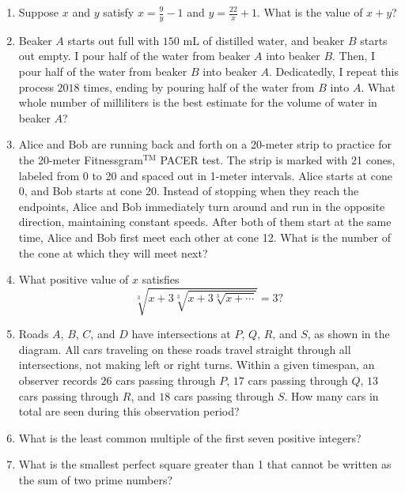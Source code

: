 \documentclass[11pt]{article}
\begin{document}
\begin{enumerate}[1.]
			\item Suppose $x$ and $y$ satisfy $x = \frac{9}{y} - 1$ and $y = \frac{22}{x} + 1$. What is the value of $x + y$?
			
			\item Beaker $A$ starts out full with $150$ mL of distilled water, and beaker $B$ starts out empty. I pour half of the water from beaker $A$ into beaker $B$. Then, I pour half of the water from beaker $B$ into beaker $A$. Dedicatedly, I repeat this process $2018$ times, ending by pouring half of the water from $B$ into $A$. What whole number of milliliters is the best estimate for the volume of water in beaker $A$?
			
			\item Alice and Bob are running back and forth on a 20-meter strip to practice for the 20-meter Fitnessgram$^\text{TM}$ PACER test. The strip is marked with 21 cones, labeled from 0 to 20 and spaced out in 1-meter intervals. Alice starts at cone 0, and Bob starts at cone 20. Instead of stopping when they reach the endpoints, Alice and Bob immediately turn around and run in the opposite direction, maintaining constant speeds. After both of them start at the same time, Alice and Bob first meet each other at cone 12. What is the number of the cone at which they will meet next?
			
			\item What positive value of $x$ satisfies
			$$\sqrt[3]{x + 3\sqrt[3]{x + 3\sqrt[3]{x + \cdots}}} = 3 ?$$
			
			\item Roads $A$, $B$, $C$, and $D$ have intersections at $P$, $Q$, $R$, and $S$, as shown in the diagram. All cars traveling on these roads travel straight through all intersections, not making left or right turns. Within a given timespan, an observer records $26$ cars passing through $P$, $17$ cars passing through $Q$, $13$ cars passing through $R$, and $18$ cars passing through $S$. How many cars in total are seen during this observation period?
      
			\item What is the least common multiple of the first seven positive integers?
			
			\item What is the smallest perfect square greater than 1 that cannot be written as the sum of two prime numbers?
			
			

\end{enumerate}
\end{document}
